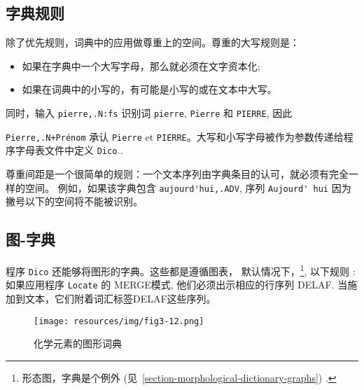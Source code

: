 \subsection{字典规则}
\label{section-transducer-application-rules}

除了优先规则，词典中的应用做尊重上的空间。尊重的大写规则是：


\begin{itemize}
  \item 如果在字典中一个大写字母，那么就必须在文字资本化;

  \item 如果在词典中的小写的，有可能是小写的或在文本中大写。

\end{itemize}

\noindent 同时，输入 \verb$pierre,.N:fs$ 识别词 \verb+pierre+,
\verb+Pierre+ 和 \verb+PIERRE+, 因此

\noindent \verb$Pierre,.N+Prénom$ 承认 \verb+Pierre+ et \verb+PIERRE+。大写和小写字母被作为参数传递给程序字母表文件中定义 \verb+Dico+
.

\bigskip
\noindent 尊重间距是一个很简单的规则：一个文本序列由字典条目的认可，就必须有完全一样的空间。
例如，如果该字典包含 \verb+aujourd'hui,.ADV+, 序列 \verb+Aujourd' hui+ 因为撇号以下的空间将不能被识别。


\subsection{图-字典}
\label{section-dictionary-graphs}
程序 \verb+Dico+ 还能够将图形的字典。这些都是遵循图表，
默认情况下，\footnote{形态图，字典是个例外
(见~\ref{section-morphological-dictionary-graphs}) .}, 以下规则 :
如果应用程序 \verb+Locate+ 的 MERGE模式, 他们必须出示相应的行序列 DELAF.
当施加到文本，它们附着词汇标签DELAF这些序列。


\begin{figure}[!p]
\begin{center}
\texttt{[image: resources/img/fig3-12.png]}
\caption{化学元素的图形词典\label{elements}}
\end{center}
\end{figure}


